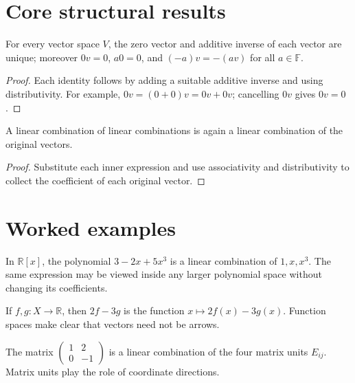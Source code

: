 \section{Core structural results}

\begin{theorem}\label{thm:i01-01}
For every vector space $V$, the zero vector and additive inverse of each vector are unique; moreover $0v=0$, $a0=0$, and $(-a)v=-(av)$ for all $a\in\mathbb F$.
\begin{proof}
Each identity follows by adding a suitable additive inverse and using distributivity. For example, $0v=(0+0)v=0v+0v$; cancelling $0v$ gives $0v=0$.
\end{proof}
\end{theorem}

\begin{theorem}\label{thm:i01-02}
A linear combination of linear combinations is again a linear combination of the original vectors.
\begin{proof}
Substitute each inner expression and use associativity and distributivity to collect the coefficient of each original vector.
\end{proof}
\end{theorem}

\section{Worked examples}

\begin{example}[Polynomials]\label{ex:i01-worked-01}
In $\mathbb R[x]$, the polynomial $3-2x+5x^3$ is a linear combination of $1,x,x^3$. The same expression may be viewed inside any larger polynomial space without changing its coefficients.
\end{example}

\begin{example}[Functions]\label{ex:i01-worked-02}
If $f,g:X\to\mathbb R$, then $2f-3g$ is the function $x\mapsto 2f(x)-3g(x)$. Function spaces make clear that vectors need not be arrows.
\end{example}

\begin{example}[Matrices]\label{ex:i01-worked-03}
The matrix $\begin{pmatrix}1&2\\0&-1\end{pmatrix}$ is a linear combination of the four matrix units $E_{ij}$. Matrix units play the role of coordinate directions.
\end{example}

